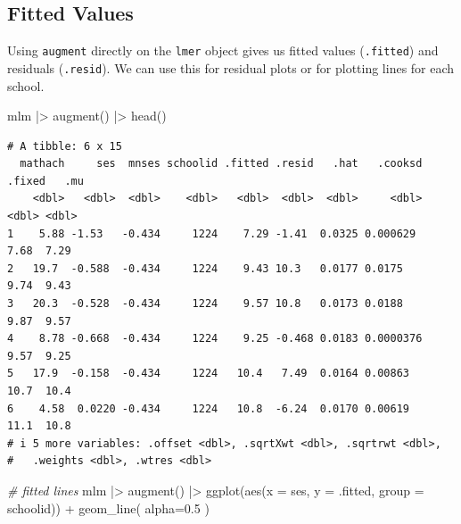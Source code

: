 \documentclass[
  letterpaper,
  DIV=11,
  numbers=noendperiod]{scrreprt}
\newenvironment{Shaded}{}{}
\newcommand{\AttributeTok}[1]{\textcolor[rgb]{0.49,0.56,0.16}{#1}}
\newcommand{\CommentTok}[1]{\textcolor[rgb]{0.38,0.63,0.69}{\textit{#1}}}
\newcommand{\FloatTok}[1]{\textcolor[rgb]{0.25,0.63,0.44}{#1}}
\newcommand{\FunctionTok}[1]{\textcolor[rgb]{0.02,0.16,0.49}{#1}}
\newcommand{\NormalTok}[1]{#1}
\newcommand{\SpecialCharTok}[1]{\textcolor[rgb]{0.25,0.44,0.63}{#1}}
\begin{document}
\subsection{Fitted Values}\label{fitted-values}

Using \texttt{augment} directly on the \texttt{lmer} object gives us
fitted values (\texttt{.fitted}) and residuals (\texttt{.resid}). We can
use this for residual plots or for plotting lines for each school.

\begin{Shaded}
\begin{Highlighting}[]
\NormalTok{mlm }\SpecialCharTok{|\textgreater{}} 
  \FunctionTok{augment}\NormalTok{() }\SpecialCharTok{|\textgreater{}} 
  \FunctionTok{head}\NormalTok{()}
\end{Highlighting}
\end{Shaded}

\begin{verbatim}
# A tibble: 6 x 15
  mathach     ses  mnses schoolid .fitted .resid   .hat   .cooksd .fixed   .mu
    <dbl>   <dbl>  <dbl>    <dbl>   <dbl>  <dbl>  <dbl>     <dbl>  <dbl> <dbl>
1    5.88 -1.53   -0.434     1224    7.29 -1.41  0.0325 0.000629    7.68  7.29
2   19.7  -0.588  -0.434     1224    9.43 10.3   0.0177 0.0175      9.74  9.43
3   20.3  -0.528  -0.434     1224    9.57 10.8   0.0173 0.0188      9.87  9.57
4    8.78 -0.668  -0.434     1224    9.25 -0.468 0.0183 0.0000376   9.57  9.25
5   17.9  -0.158  -0.434     1224   10.4   7.49  0.0164 0.00863    10.7  10.4 
6    4.58  0.0220 -0.434     1224   10.8  -6.24  0.0170 0.00619    11.1  10.8 
# i 5 more variables: .offset <dbl>, .sqrtXwt <dbl>, .sqrtrwt <dbl>,
#   .weights <dbl>, .wtres <dbl>
\end{verbatim}

\begin{Shaded}
\begin{Highlighting}[]
\CommentTok{\# fitted lines}
\NormalTok{mlm }\SpecialCharTok{|\textgreater{}} 
  \FunctionTok{augment}\NormalTok{() }\SpecialCharTok{|\textgreater{}} 
  \FunctionTok{ggplot}\NormalTok{(}\FunctionTok{aes}\NormalTok{(}\AttributeTok{x =}\NormalTok{ ses, }\AttributeTok{y =}\NormalTok{ .fitted, }\AttributeTok{group =}\NormalTok{ schoolid)) }\SpecialCharTok{+}
  \FunctionTok{geom\_line}\NormalTok{( }\AttributeTok{alpha=}\FloatTok{0.5}\NormalTok{ )}
\end{Highlighting}
\end{Shaded}
\end{document}
